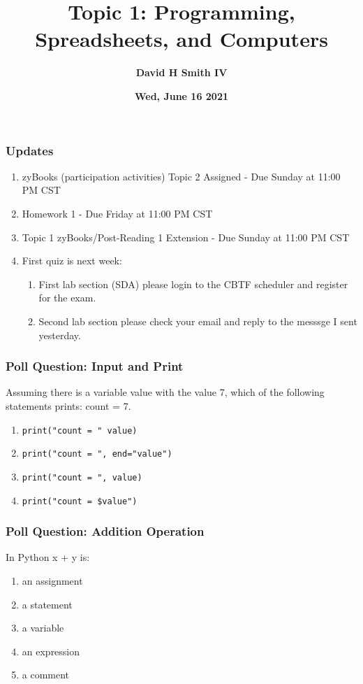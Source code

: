 \documentclass{beamer}
\title{\textbf{Topic 1: Programming, Spreadsheets, and Computers}}
\author{\textbf{David H Smith IV}}
\institute[\textbf{UIUC}]{\textbf{University of Illinois Urbana-Champaign}}
\date{\textbf{Wed, June 16 2021}}
\begin{document}
\frame{\titlepage}

\begin{frame}
  \frametitle{Updates}
  \begin{enumerate}
    \item zyBooks (participation activities) Topic 2 Assigned - Due Sunday at 11:00 PM CST
    \item Homework 1 - Due Friday at 11:00 PM CST
    \item Topic 1 zyBooks/Post-Reading 1 Extension - Due Sunday at 11:00 PM CST
    \item First quiz is next week:
      \begin{enumerate}
        \item First lab section (SDA) please login to the CBTF scheduler and register for the exam.
        \item Second lab section please check your email and reply to the messsge I sent yesterday.
      \end{enumerate}
  \end{enumerate}
\end{frame}

%
% 
%
\begin{frame}[fragile]
  \frametitle{Poll Question: Input and Print}
  Assuming there is a variable value with the value 7, which of the following statements prints: count = 7.
  \begin{enumerate}
    \item \lstinline{print("count = " value)}
    \item \lstinline{print("count = ", end="value")}
    \item \lstinline{print("count = ", value)}
    \item \lstinline{print("count = $value")}
  \end{enumerate}
\end{frame}

%
%
%
\begin{frame}
  \frametitle{Poll Question: Addition Operation}
  In Python x + y is:
  \begin{enumerate}
    \item an assignment
    \item a statement
    \item a variable
    \item an expression
    \item a comment
  \end{enumerate}
\end{frame}
\end{document}
